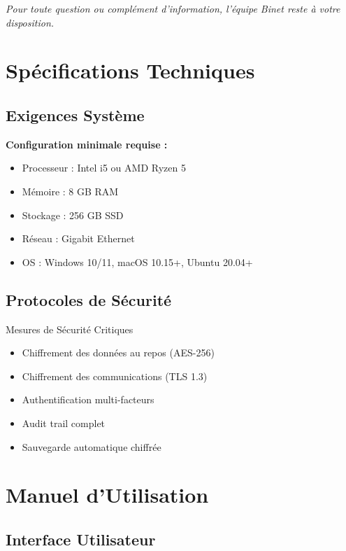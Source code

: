 \documentclass{modern-report}
\begin{document}
\modernseparator

\textit{Pour toute question ou complément d'information, l'équipe Binet reste à votre disposition.}

\appendix

\chapter{Spécifications Techniques}

\section{Exigences Système}

\textbf{Configuration minimale requise :}
\begin{itemize}
    \item Processeur : Intel i5 ou AMD Ryzen 5
    \item Mémoire : 8 GB RAM
    \item Stockage : 256 GB SSD
    \item Réseau : Gigabit Ethernet
    \item OS : Windows 10/11, macOS 10.15+, Ubuntu 20.04+
\end{itemize}

\section{Protocoles de Sécurité}

\begin{warningbox}{Mesures de Sécurité Critiques}
\begin{itemize}
    \item Chiffrement des données au repos (AES-256)
    \item Chiffrement des communications (TLS 1.3)
    \item Authentification multi-facteurs
    \item Audit trail complet
    \item Sauvegarde automatique chiffrée
\end{itemize}
\end{warningbox}

\chapter{Manuel d'Utilisation}

\section{Interface Utilisateur}
\end{document}
